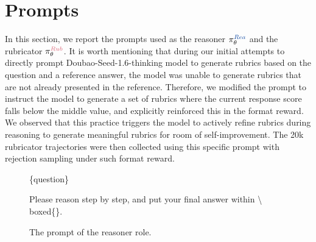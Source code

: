 \clearpage
\section{Prompts} \label{apdx:prompts}
In this section, we report the prompts used as the reasoner $\pi_{\theta}^{\text{\textcolor{reasoner}{$Rea$}}}$ and the rubricator $\pi_{\theta}^{\text{\textcolor{rubricator}{$Rub$}}}$. It is worth mentioning that during our initial attempts to directly prompt Doubao-Seed-1.6-thinking model to generate rubrics based on the question and a reference answer, the model was unable to generate rubrics that are not already presented in the reference. Therefore, we modified the prompt to instruct the model to generate a set of rubrics where the current response score falls below the middle value, and explicitly reinforced this in the format reward. We observed that this practice triggers the model to actively refine rubrics during reasoning to generate meaningful rubrics for room of self-improvement. The 20k rubricator trajectories were then collected using this specific prompt with rejection sampling under such format reward.



\begin{figure}[!ht]
    \centering
    \begin{lrbox}{\DSRPrompt}
    \begin{gptpromptbox}
    \begin{minipage}{0.95\linewidth}
    \raggedright
    \scriptsize\ttfamily
\setlength{\baselineskip}{1\baselineskip}
\{question\}

Please reason step by step, and put your final answer within \textbackslash
 boxed\{\}.
\end{minipage}
    \end{gptpromptbox}
    \end{lrbox}
    \usebox{\DSRPrompt}
    \caption{The prompt of the reasoner role.}
    \label{fig:evaluation-prompts}
\end{figure}


